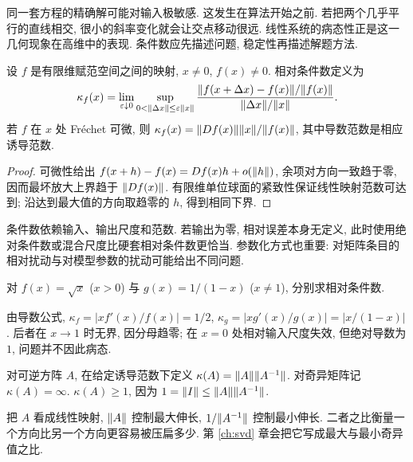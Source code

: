 \label{ch:condition}
同一套方程的精确解可能对输入极敏感. 这发生在算法开始之前. 若把两个几乎平行的直线相交, 很小的斜率变化就会让交点移动很远. 线性系统的病态性正是这一几何现象在高维中的表现. 条件数应先描述问题, 稳定性再描述解题方法.

\begin{definition}
设 $f$ 是有限维赋范空间之间的映射, $x\ne0$, $f(x)\ne0$. 相对条件数定义为
\[
\kappa_f(x)=\lim_{\varepsilon\downarrow0}\sup_{0<\lVert \Delta x\rVert\le\varepsilon\lVert x\rVert}
\frac{\lVert f(x+\Delta x)-f(x)\rVert/\lVert f(x)\rVert}{\lVert \Delta x\rVert/\lVert x\rVert}.
\]
若 $f$ 在 $x$ 处 Fr\'echet 可微, 则 $\kappa_f(x)=\lVert Df(x)\rVert\lVert x\rVert/\lVert f(x)\rVert$, 其中导数范数是相应诱导范数.
\end{definition}
\begin{proof}
可微性给出 $f(x+h)-f(x)=Df(x)h+o(\lVert h\rVert)$, 余项对方向一致趋于零, 因而最坏放大上界趋于 $\lVert Df(x)\rVert$. 有限维单位球面的紧致性保证线性映射范数可达到; 沿达到最大值的方向取趋零的 $h$, 得到相同下界.
\end{proof}
条件数依赖输入、输出尺度和范数. 若输出为零, 相对误差本身无定义, 此时使用绝对条件数或混合尺度比硬套相对条件数更恰当. 参数化方式也重要: 对矩阵条目的相对扰动与对模型参数的扰动可能给出不同问题.

\begin{example}
对 $f(x)=\sqrt{x}$ ($x>0$) 与 $g(x)=1/(1-x)$ ($x\ne1$), 分别求相对条件数.
\end{example}
\begin{solution}
由导数公式,
$\kappa_f=|x f'(x)/f(x)|=1/2$,
$\kappa_g=|x g'(x)/g(x)|=|x/(1-x)|$.
后者在 $x\to1$ 时无界, 因分母趋零; 在 $x=0$ 处相对输入尺度失效, 但绝对导数为 $1$, 问题并不因此病态.
\end{solution}

\begin{definition}
对可逆方阵 $A$, 在给定诱导范数下定义 $\kappa(A)=\lVert A\rVert\lVert A^{-1}\rVert$. 对奇异矩阵记 $\kappa(A)=\infty$. $\kappa(A)\ge1$, 因为 $1=\lVert I\rVert\le\lVert A\rVert\lVert A^{-1}\rVert$.
\end{definition}
把 $A$ 看成线性映射, $\lVert A\rVert$ 控制最大伸长, $1/\lVert A^{-1}\rVert$ 控制最小伸长. 二者之比衡量一个方向比另一个方向更容易被压扁多少. 第 \ref{ch:svd} 章会把它写成最大与最小奇异值之比.

